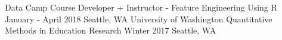 \begin{cventries}
   \cventry
    {Data Camp}
    {Course Developer + Instructor - Feature Engineering Using R}
    {January - April 2018}
    {Seattle, WA}
    {
   }
 \cventry
{University of Washington}
{Quantitative Methods in Education Research}
{Winter 2017}
{Seattle, WA}
{
}
   \end{cventries}
